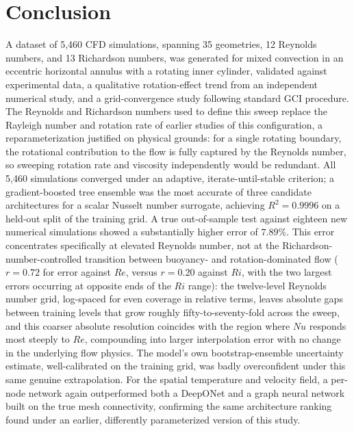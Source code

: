 \section{Conclusion}
\label{sec:conclusion}

A dataset of 5,460 CFD simulations, spanning 35 geometries, 12 Reynolds numbers, and 13 Richardson numbers, was generated for mixed convection in an eccentric horizontal annulus with a rotating inner cylinder, validated against experimental data, a qualitative rotation-effect trend from an independent numerical study, and a grid-convergence study following standard GCI procedure. The Reynolds and Richardson numbers used to define this sweep replace the Rayleigh number and rotation rate of earlier studies of this configuration, a reparameterization justified on physical grounds: for a single rotating boundary, the rotational contribution to the flow is fully captured by the Reynolds number, so sweeping rotation rate and viscosity independently would be redundant. All 5,460 simulations converged under an adaptive, iterate-until-stable criterion; a gradient-boosted tree ensemble was the most accurate of three candidate architectures for a scalar Nusselt number surrogate, achieving $R^2=0.9996$ on a held-out split of the training grid. A true out-of-sample test against eighteen new numerical simulations showed a substantially higher error of $7.89\%$. This error concentrates specifically at elevated Reynolds number, not at the Richardson-number-controlled transition between buoyancy- and rotation-dominated flow ($r=0.72$ for error against $Re$, versus $r=0.20$ against $Ri$, with the two largest errors occurring at opposite ends of the $Ri$ range): the twelve-level Reynolds number grid, log-spaced for even coverage in relative terms, leaves absolute gaps between training levels that grow roughly fifty-to-seventy-fold across the sweep, and this coarser absolute resolution coincides with the region where $Nu$ responds most steeply to $Re$, compounding into larger interpolation error with no change in the underlying flow physics. The model's own bootstrap-ensemble uncertainty estimate, well-calibrated on the training grid, was badly overconfident under this same genuine extrapolation. For the spatial temperature and velocity field, a per-node network again outperformed both a DeepONet and a graph neural network built on the true mesh connectivity, confirming the same architecture ranking found under an earlier, differently parameterized version of this study.

